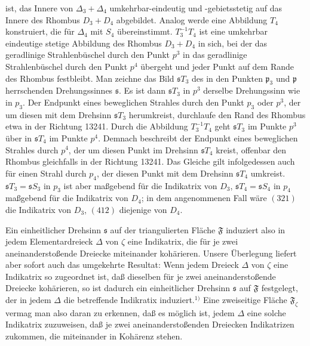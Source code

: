 \documentclass{article}
\begin{document}
ist, das Innere von $\Delta_3 + \Delta_4$ umkehrbar-eindeutig und -gebietsstetig auf das Innere des Rhombus $D_3 + D_4$ abgebildet. Analog werde eine Abbildung $T_4$ konstruiert, die für $\Delta_4$ mit $S_4$ übereinstimmt. $T_3^{-1} T_4$ ist eine umkehrbar eindeutige stetige Abbildung des Rhombus $D_3 + D_4$ in sich, bei der das geradlinige Strahlenbüschel durch den Punkt $p^3$ in das geradlinige Strahlenbüschel durch den Punkt $p^4$ übergeht und jeder Punkt auf dem Rande des Rhombus festbleibt. Man zeichne das Bild $\mathfrak{s} T_3$ des in den Punkten $\mathfrak{p}_3$ und $\mathfrak{p}$ herrschenden Drehungssinnes $\mathfrak{s}$. Es ist dann $\mathfrak{s} T_3$ in $p^3$ derselbe Drehungssinn wie in $p_3$. Der Endpunkt eines beweglichen Strahles durch den Punkt $p_3$ oder $p^3$, der um diesen mit dem Drehsinn $\mathfrak{s} T_3$ herumkreist, durchlaufe den Rand des Rhombus etwa in der Richtung 13241. Durch die Abbildung $T_3^{-1} T_4$ geht $\mathfrak{s} T_3$ im Punkte $p^3$ über in $\mathfrak{s} T_4$ im Punkte $p^4$. Demnach beschreibt der Endpunkt eines beweglichen Strahles durch $p^4$, der um diesen Punkt im Drehsinn $\mathfrak{s} T_4$ kreist, offenbar den Rhombus gleichfalls in der Richtung 13241. Das Gleiche gilt infolgedessen auch für einen Strahl durch $p_4$, der diesen Punkt mit dem Drehsinn $\mathfrak{s} T_4$ umkreist. $\mathfrak{s} T_3 = \mathfrak{s} S_3$ in $p_3$ ist aber maßgebend für die Indikatrix von $D_3$, $\mathfrak{s} T_4 = \mathfrak{s} S_4$ in $p_4$ maßgebend für die Indikatrix von $D_4$; in dem angenommenen Fall wäre $(321)$ die Indikatrix von $D_3$, $(412)$ diejenige von $D_4$.


Ein einheitlicher Drehsinn $\mathfrak{s}$ auf der triangulierten Fläche $\mathfrak{F}$ induziert also in jedem Elementardreieck $\Delta$ von $\zeta$ eine Indikatrix, die für je zwei aneinanderstoßende Dreiecke miteinander kohärieren. Unsere Überlegung liefert aber sofort auch das umgekehrte Resultat: Wenn jedem Dreieck $\Delta$ von $\zeta$ eine Indikatrix so zugeordnet ist, daß dieselben für je zwei aneinanderstoßende Dreiecke kohärieren, so ist dadurch ein einheitlicher Drehsinn $\mathfrak{s}$ auf $\mathfrak{F}$ festgelegt, der in jedem $\Delta$ die betreffende Indikratix induziert.${}^{1)}$ Eine zweiseitige Fläche $\mathfrak{F}_\zeta$ vermag man also daran zu erkennen, daß es möglich ist, jedem $\Delta$ eine solche Indikatrix zuzuweisen, daß je zwei aneinanderstoßenden Dreiecken Indikatrizen zukommen, die miteinander in Kohärenz stehen.
\end{document}
